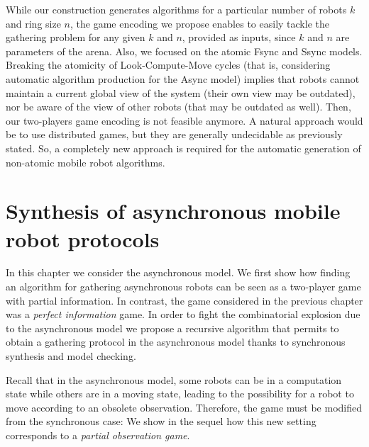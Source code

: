 While our construction generates algorithms for a particular number of robots $k$ and ring size $n$, the game encoding we propose enables to easily tackle the gathering problem for any given $k$ and $n$, provided as inputs, since $k$ and $n$ are parameters of the arena. Also, we focused on the atomic Fsync and Ssync models. Breaking the atomicity of Look-Compute-Move cycles (that is, considering automatic algorithm production for the Async model) implies that robots cannot maintain a current global view of the system (their own view may be outdated), nor be aware of the view of other robots (that may be outdated as well). Then, our two-players game encoding is not feasible anymore. A natural approach would be to use distributed games, but they are generally undecidable as previously stated. So, a completely new approach is required for the automatic generation of non-atomic mobile robot algorithms.


		

	
\chapter[Asynchronous Synthesis]{Synthesis of asynchronous mobile robot protocols}
\label{chap:asynth}
In this chapter we consider the asynchronous model. 
We first show how finding an algorithm for gathering asynchronous robots 
can be seen as a two-player game with partial information. In contrast, the game 
considered in the previous chapter was a \emph{perfect information} game.
In order to fight the combinatorial explosion due to the asynchronous model
we propose a recursive algorithm that permits to obtain a gathering
protocol in the asynchronous model thanks to synchronous 
synthesis and model checking. 	

Recall that in the asynchronous model, some robots can be in a computation state while others are in a moving state, 
leading to the possibility for a robot to  move according to an obsolete observation. Therefore, the game must be modified 
from the synchronous case:  We show in the sequel how this new setting corresponds to a 
\emph{partial observation game}.






